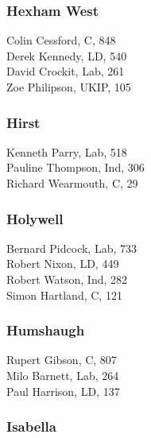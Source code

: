 \documentclass[a4paper,openany,10pt]{book}
\begin{document}
\subsubsection*{Hexham West}



Colin Cessford, C, 848\\
Derek Kennedy, LD, 540\\
David Crockit, Lab, 261\\
Zoe Philipson, UKIP, 105\\


\subsubsection*{Hirst}



Kenneth Parry, Lab, 518\\
Pauline Thompson, Ind, 306\\
Richard Wearmouth, C, 29\\


\subsubsection*{Holywell}



Bernard Pidcock, Lab, 733\\
Robert Nixon, LD, 449\\
Robert Watson, Ind, 282\\
Simon Hartland, C, 121\\


\subsubsection*{Humshaugh}



Rupert Gibson, C, 807\\
Milo Barnett, Lab, 264\\
Paul Harrison, LD, 137\\


\subsubsection*{Isabella}
\end{document}
